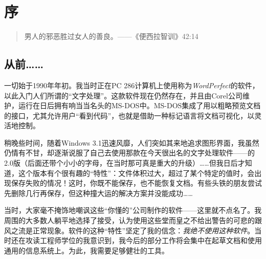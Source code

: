 \chapter*{序}

\begin{quote}
    男人的邪恶胜过女人的善良。——《便西拉智训》42:14
\end{quote}

\section*{从前……}

一切始于1990年年初。我当时正在PC 286计算机上使用称为\emph{WordPerfect}的软件，以此入门人们所谓的“文字处理”。这款软件现在仍然存在，并且由Corel公司维护，运行在日后拥有响当当名头的MS-DOS中。MS-DOS集成了用以粗略预览文档的接口，尤其允许用户“看到代码”，也就是借助一种标记语言将文档可视化，以灵活地控制。

稍晚些时间，随着Windows 3.1迅速风靡，人们突如其来地追求图形界面，我虽然仍情有不甘，却逐渐说服了自己去使用那款在今天很出名的文字处理软件——的2.0版（后面还带个小小的字母，在当时那可真是重大的升级）……但我日后才知道，这个版本有个很有趣的“特性”：文件体积过大，超过了某个特定的值时，会出现保存失败的情况！这时，你既不能保存，也不能恢复文档。有些头铁的朋友尝试先删除几行再保存，但这种撞大运的解决方案并没能成功……

当时，大家毫不掩饰地嘲讽这些“你懂的”公司制作的软件——这里就不点名了。我周围的大多数人躺平地选择了接受，认为使用这些堂而皇之不给出警告的可悲的跟风之流是正常现象。软件的这种“特性”坚定了我的信念：\emph{我绝不使用这种软件}。当时还在攻读工程师学位的我意识到，我今后的部分工作将会集中在起草文档和使用通用的信息系统上。为此，我需要足够健壮的工具。

